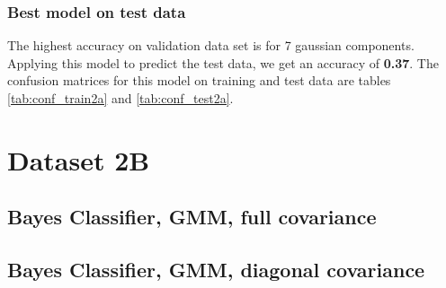 \documentclass[11pt,a4paper]{article}
\begin{document}
\subsubsection{Best model on test data}
The highest accuracy on validation data set is for 7 gaussian components. Applying this model to predict the test data, we get an accuracy of \textbf{0.37}. The confusion matrices for this model on training and test data are tables \ref{tab:conf_train2a} and \ref{tab:conf_test2a}.



\break
\section{Dataset 2B}
\subsection{Bayes Classifier, GMM, full covariance}
\subsection{Bayes Classifier, GMM, diagonal covariance}
\end{document}

